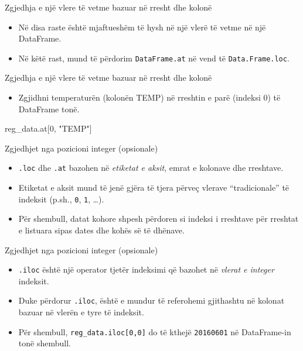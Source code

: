 \documentclass[
  ignorenonframetext,
]{beamer}
\newenvironment{Shaded}{\begin{snugshade}}{\end{snugshade}}
\newcommand{\DecValTok}[1]{\textcolor[rgb]{0.00,0.00,0.81}{#1}}
\newcommand{\NormalTok}[1]{#1}
\newcommand{\StringTok}[1]{\textcolor[rgb]{0.31,0.60,0.02}{#1}}
\providecommand{\tightlist}{%
  \setlength{\itemsep}{0pt}\setlength{\parskip}{0pt}}
\begin{document}
\begin{frame}[fragile]{Zgjedhja e një vlere të vetme bazuar në rresht
dhe kolonë}
\protect\hypertarget{zgjedhja-e-njuxeb-vlere-tuxeb-vetme-bazuar-nuxeb-rresht-dhe-kolonuxeb}{}
\begin{itemize}
\item
  Në disa raste është mjaftueshëm të hysh në një vlerë të vetme në një
  DataFrame.
\item
  Në këtë rast, mund të përdorim \texttt{DataFrame.at} në vend të
  \texttt{Data.Frame.loc}.
\end{itemize}
\end{frame}

\begin{frame}[fragile]{Zgjedhja e një vlere të vetme bazuar në rresht
dhe kolonë}
\protect\hypertarget{zgjedhja-e-njuxeb-vlere-tuxeb-vetme-bazuar-nuxeb-rresht-dhe-kolonuxeb-1}{}
\begin{itemize}
\tightlist
\item
  Zgjidhni temperaturën (kolonën TEMP) në rreshtin e parë (indeksi 0) të
  DataFrame tonë.
\end{itemize}

\begin{Shaded}
\begin{Highlighting}[]
\NormalTok{reg\_data.at[}\DecValTok{0}\NormalTok{, }\StringTok{"TEMP"}\NormalTok{]}
\end{Highlighting}
\end{Shaded}
\end{frame}

\begin{frame}[fragile]{Zgjedhjet nga pozicioni integer (opsionale)}
\protect\hypertarget{zgjedhjet-nga-pozicioni-integer-opsionale}{}
\begin{itemize}
\item
  \texttt{.loc} dhe \texttt{.at} bazohen në \emph{etiketat e aksit},
  emrat e kolonave dhe rreshtave.
\item
  Etiketat e aksit mund të jenë gjëra të tjera përveç vlerave
  ``tradicionale'' të indeksit (p.sh., \texttt{0}, \texttt{1}, \ldots).
\item
  Për shembull, datat kohore shpesh përdoren si indeksi i rreshtave për
  rreshtat e listuara sipas dates dhe kohës së të dhënave.
\end{itemize}
\end{frame}

\begin{frame}[fragile]{Zgjedhjet nga pozicioni integer (opsionale)}
\protect\hypertarget{zgjedhjet-nga-pozicioni-integer-opsionale-1}{}
\begin{itemize}
\item
  \texttt{.iloc} është një operator tjetër indeksimi që bazohet në
  \emph{vlerat e integer} indeksit.
\item
  Duke përdorur \texttt{.iloc}, është e mundur të referohemi gjithashtu
  në kolonat bazuar në vlerën e tyre të indeksit.
\item
  Për shembull, \texttt{reg\_data.iloc{[}0,0{]}} do të kthejë
  \texttt{20160601} në DataFrame-in tonë shembull.
\end{itemize}
\end{frame}
\end{document}
